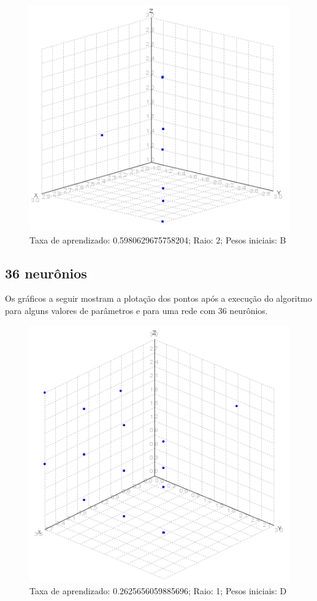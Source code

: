 \begin{figure}[ht!]
	\centering
	\includegraphics[scale=0.65]{./imgs/2b2.png}
	\caption{Taxa de aprendizado: 0.5980629675758204; Raio: 2; Pesos iniciais: B}
\end{figure}

\subsection{36 neurônios}
Os gráficos a seguir mostram a plotação dos pontos após a execução do algoritmo para alguns valores de parâmetros e para
uma rede com 36 neurônios.

\begin{figure}[ht!]
	\centering
	\includegraphics[scale=0.65]{./imgs/2d1.png}
	\caption{Taxa de aprendizado: 0.2625656059885696; Raio: 1; Pesos iniciais: D}
\end{figure}

